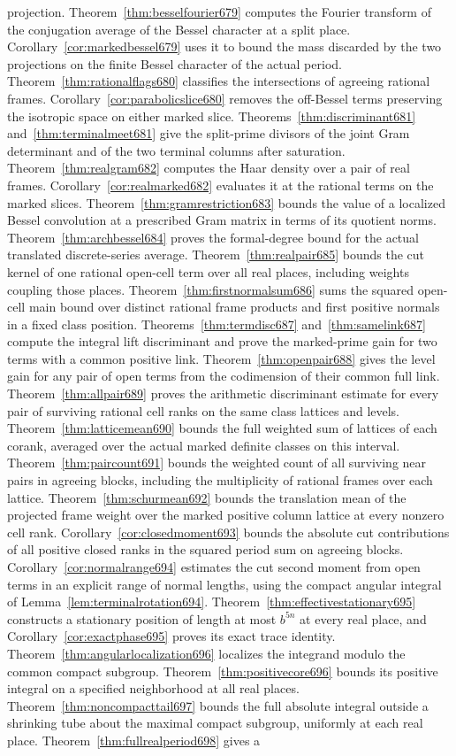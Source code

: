 \documentclass[a4paper,11pt]{article}
\theoremstyle{definition}
\theoremstyle{remark}
\numberwithin{equation}{section}
\begin{document}
projection. Theorem~\ref{thm:besselfourier679} computes the Fourier transform of the conjugation average of the Bessel character at a split place. Corollary~\ref{cor:markedbessel679} uses it to bound the mass discarded by the two projections on the finite Bessel character of the actual period. Theorem~\ref{thm:rationalflags680} classifies the intersections of agreeing rational frames. Corollary~\ref{cor:parabolicslice680} removes the off-Bessel terms preserving the isotropic space on either marked slice. Theorems~\ref{thm:discriminant681} and~\ref{thm:terminalmeet681} give the split-prime divisors of the joint Gram determinant and of the two terminal columns after saturation. Theorem~\ref{thm:realgram682} computes the Haar density over a pair of real frames. Corollary~\ref{cor:realmarked682} evaluates it at the rational terms on the marked slices. Theorem~\ref{thm:gramrestriction683} bounds the value of a localized Bessel convolution at a prescribed Gram matrix in terms of its quotient norms. Theorem~\ref{thm:archbessel684} proves the formal-degree bound for the actual translated discrete-series average. Theorem~\ref{thm:realpair685} bounds the cut kernel of one rational open-cell term over all real places, including weights coupling those places. Theorem~\ref{thm:firstnormalsum686} sums the squared open-cell main bound over distinct rational frame products and first positive normals in a fixed class position. Theorems~\ref{thm:termdisc687} and~\ref{thm:samelink687} compute the integral lift discriminant and prove the marked-prime gain for two terms with a common positive link. Theorem~\ref{thm:openpair688} gives the level gain for any pair of open terms from the codimension of their common full link. Theorem~\ref{thm:allpair689} proves the arithmetic discriminant estimate for every pair of surviving rational cell ranks on the same class lattices and levels. Theorem~\ref{thm:latticemean690} bounds the full weighted sum of lattices of each corank, averaged over the actual marked definite classes on this interval. Theorem~\ref{thm:paircount691} bounds the weighted count of all surviving near pairs in agreeing blocks, including the multiplicity of rational frames over each lattice. Theorem~\ref{thm:schurmean692} bounds the translation mean of the projected frame weight over the marked positive column lattice at every nonzero cell rank. Corollary~\ref{cor:closedmoment693} bounds the absolute cut contributions of all positive closed ranks in the squared period sum on agreeing blocks. Corollary~\ref{cor:normalrange694} estimates the cut second moment from open terms in an explicit range of normal lengths, using the compact angular integral of Lemma~\ref{lem:terminalrotation694}. Theorem~\ref{thm:effectivestationary695} constructs a stationary position of length at most \(b^{5n}\) at every real place, and Corollary~\ref{cor:exactphase695} proves its exact trace identity. Theorem~\ref{thm:angularlocalization696} localizes the integrand modulo the common compact subgroup. Theorem~\ref{thm:positivecore696} bounds its positive integral on a specified neighborhood at all real places. Theorem~\ref{thm:noncompacttail697} bounds the full absolute integral outside a shrinking tube about the maximal compact subgroup, uniformly at each real place. Theorem~\ref{thm:fullrealperiod698} gives a 
\end{document}
